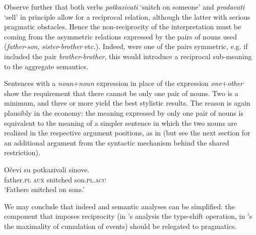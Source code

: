 \documentclass[output=paper,colorlinks,citecolor=brown]{langscibook}
\begin{document}
\ea\label{ex:Otac1}
\label{ex:Otac1-a}
\label{ex:Otac1-b}
\z \z

\noindent Observe further that both verbs \textit{potkazivati} `snitch on someone' and \textit{prodavati} `sell' in principle allow for a reciprocal relation, although the latter with serious pragmatic obstacles. Hence the non-reciprocity of the interpretation must be coming from the asymmetric relations expressed by the pairs of nouns used (\textit{father}-\textit{son}, \textit{sister}-\textit{brother} etc.). Indeed, were one of the pairs symmetric, e.g. if  included the pair \textit{brother}-\textit{brother}, this would introduce a reciprocal sub-meaning to the aggregate semantics. 

Sentences with a \textit{noun}+\textit{noun} expression in place of the expression \textit{one}+\textit{other} show the requirement that there cannot be only one pair of nouns. Two is a minimum, and three or more yield the best stylistic results. The reason is again plausibly in the economy: the meaning expressed by only one pair of nouns is equivalent to the meaning of a simpler sentence in which the two nouns are realized in the respective argument positions, as in  (but see the next section for an additional argument from the syntactic mechanism behind the shared restriction).

\ea\label{ex:Otac1}
\gll Očevi su potkazivali sinove.\\
 father.\textsc{pl} \textsc{aux} snitched son.\textsc{pl}.\textsc{acc}\\
 \glt `Fathers snitched on sons.'
 \z

\noindent We may conclude that indeed  and  semantic analyses can be simplified: the component that imposes reciprocity (in \citeauthor{z14}'s analysis the type-shift operation, in \citeauthor{v10}'s the maximality of cumulation of events) should be relegated to pragmatics.
\end{document}
